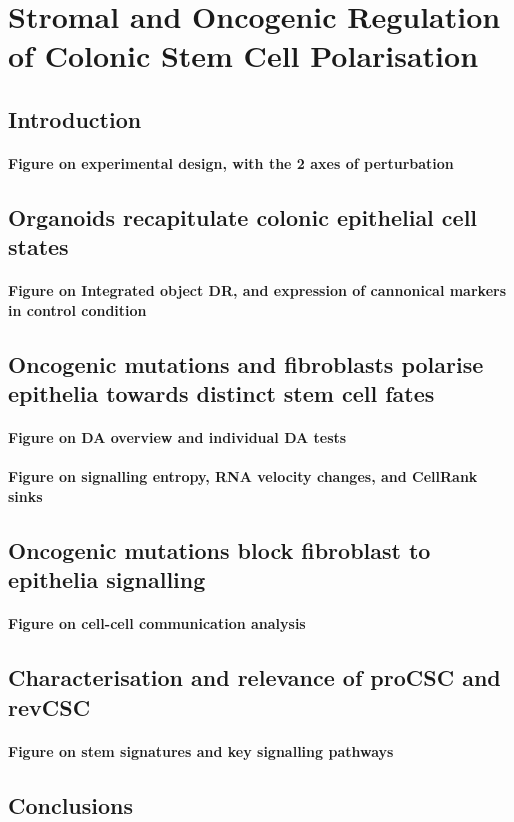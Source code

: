 \chapter{Stromal and Oncogenic Regulation of Colonic Stem Cell Polarisation}
\label{04seq}

\section{Introduction}

\subsubsection{Figure on experimental design, with the 2 axes of perturbation}

\section{Organoids recapitulate colonic epithelial cell states}

\subsubsection{Figure on Integrated object DR, and expression of cannonical markers in control condition}

\section{Oncogenic mutations and fibroblasts polarise epithelia towards distinct stem cell fates}

\subsubsection{Figure on DA overview and individual DA tests}

\subsubsection{Figure on signalling entropy, RNA velocity changes, and CellRank sinks}

\section{Oncogenic mutations block fibroblast to epithelia signalling}

\subsubsection{Figure on cell-cell communication analysis}

\section{Characterisation and relevance of proCSC and revCSC}

\subsubsection{Figure on stem signatures and key signalling pathways}

\section{Conclusions}





